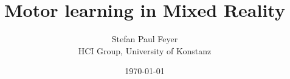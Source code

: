 \documentclass[12pt,a4paper,twoside,titlepage]{memoir}
\title{Motor learning in Mixed Reality}
\date{\today}
\author{Stefan Paul Feyer\\ HCI Group, University of Konstanz}
\begin{document}
	\reversemarginpar%
	\maketitle
	\frontmatter
	
	\tableofcontents
	\mainmatter
	
	
	
	
	
	
	
	\listoffigures
	\listoftables
\end{document}
